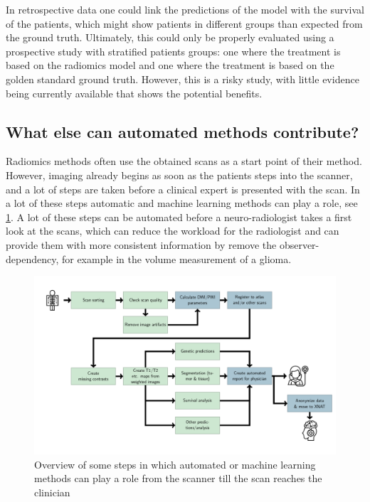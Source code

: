 In retrospective data one could link the predictions of the model with the survival of the patients, which might show patients in different groups than expected from the ground truth.
Ultimately, this could only be properly evaluated using a prospective study with stratified patients groups: one where the treatment is based on the radiomics model and one where the treatment is based on the golden standard ground truth.
However, this is a risky study, with little evidence being currently available that shows the potential benefits.

\subsection{What else can automated methods contribute?}

Radiomics methods often use the obtained scans as a start point of their method.
However, imaging already begins as soon as the patients steps into the scanner, and a lot of steps are taken before a clinical expert is presented with the scan.
In a lot of these steps automatic and machine learning methods can play a role, see \cref{fig:discussion_pipeline_automatic}.
A lot of these steps can be automated before a neuro-radiologist takes a first look at the scans, which can reduce the workload for the radiologist and can provide them with more consistent information by remove the observer-dependency, for example in the volume measurement of a \gls{glioma}.


\begin{figure}[htbp]
\includegraphics[width=\textwidth]{Figures/Pipeline.png}
\caption{Overview of some steps in which automated or machine learning methods can play a role from the scanner till the scan reaches the clinician}\label{fig:discussion_pipeline_automatic}
\end{figure}




